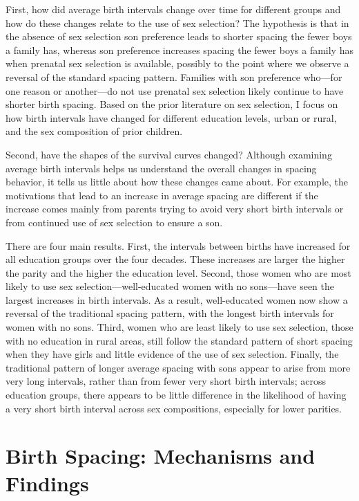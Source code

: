 \documentclass[12pt,letterpaper]{article}
\begin{document}
First, how did average birth intervals change over time for different groups and how do 
these changes relate to the use of sex selection?
The hypothesis is that in the absence of sex selection son preference leads to shorter 
spacing the fewer boys a family has, whereas son preference increases spacing the fewer 
boys a family has when prenatal sex selection is available, possibly to the point where
we observe a reversal of the standard spacing pattern.
Families with son preference who---for one reason or another---do not use prenatal sex 
selection likely continue to have shorter birth spacing.
Based on the prior literature on sex selection, I focus on how birth intervals have
changed for different education levels, urban or rural, and the sex composition of 
prior children.

Second, have the shapes of the survival curves changed?
Although examining average birth intervals helps us understand the overall changes in 
spacing behavior, it tells us little about how these changes came about.
For example, the motivations that lead to an increase in average spacing are different if 
the increase comes mainly from parents trying to avoid very short birth intervals or from 
continued use of sex selection to ensure a son.


There are four main results.
First, the intervals between births have increased for all education groups over the four 
decades.
These increases are larger the higher the parity and the higher the education 
level.
Second, those women who are most likely to use sex selection---well-educated women with no
sons---have seen the largest increases in birth intervals.
As a result, well-educated women now show a reversal of the traditional spacing 
pattern, with the longest birth intervals for women with no sons.
Third, women who are least likely to use sex selection, those with no education in
rural areas, still follow the standard pattern of short spacing when they have girls and 
little evidence of the use of sex selection.
Finally, the traditional pattern of longer average spacing with sons appear to arise from 
more very long intervals, rather than from fewer very short birth intervals; across 
education groups, there appears to be little difference in the likelihood of having a very 
short birth interval across sex compositions, especially for lower parities.



\section{Birth Spacing: Mechanisms and Findings}
\end{document}
